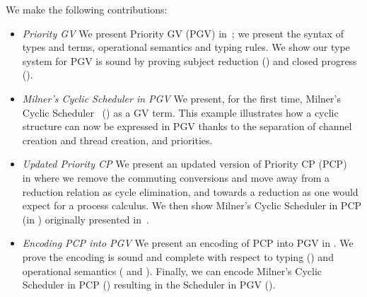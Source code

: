 \documentclass[main.tex]{subfiles}
\begin{document}
We make the following contributions:
\begin{itemize}
\item \emph{Priority GV} We present Priority GV (PGV) in~; we present the syntax of types and terms, operational semantics and typing rules. We show our type system for PGV is sound by proving subject reduction () and closed progress ().
\item \emph{Milner's Cyclic Scheduler in PGV} We present, for the first time, Milner's Cyclic Scheduler~\cite{milner89} () as a GV term. This example illustrates how a cyclic structure can now be expressed in PGV thanks to the separation of channel creation and thread creation, and priorities.
\item \emph{Updated Priority CP} We present an updated version of Priority CP (PCP)~\cite{dardhagay18} in  where we remove the commuting conversions and move away from a reduction relation as cycle elimination, and towards a reduction as one would expect for a process calculus. We then show Milner's Cyclic Scheduler in PCP (in ) originally presented in~\cite{dardhagay18}.
\item \emph{Encoding PCP into PGV} We present an encoding of PCP into PGV in . We prove the encoding is sound and complete with respect to typing () and operational semantics ( and ). Finally, we can encode Milner's Cyclic Scheduler in PCP () resulting in the Scheduler in PGV ().
\end{itemize}
\end{document}
